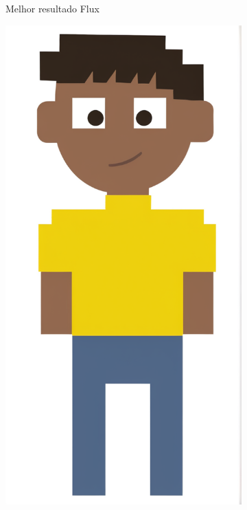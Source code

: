 \begin{figure}[htbp]
\begin{subfigure}{0.21\linewidth}
        \caption{\small Melhor resultado Flux}
        \label{fig:cgDreamMelhorImagemFlux}
    \end{subfigure}
    \begin{subfigure}{0.21\linewidth}
        \includegraphics[width=1\linewidth]{figs/cgDream/res_img_jug2b.png}

\end{subfigure}
\end{figure}
